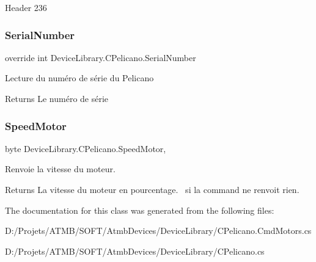 Header 236\mbox{\label{class_device_library_1_1_c_pelicano_a74a1a52309b0331bb2f6510c698a7183}} 
\subsubsection{\texorpdfstring{Serial\+Number}{SerialNumber}}
{\footnotesize\ttfamily override int Device\+Library.\+C\+Pelicano.\+Serial\+Number\hspace{0.3cm}{\ttfamily [get]}}



Lecture du numéro de série du Pelicano 

\begin{DoxyReturn}{Returns}
Le numéro de série
\end{DoxyReturn}
\mbox{\label{class_device_library_1_1_c_pelicano_a7f5c785d7c8107df1bc22912700438bc}} 
\subsubsection{\texorpdfstring{Speed\+Motor}{SpeedMotor}}
{\footnotesize\ttfamily byte Device\+Library.\+C\+Pelicano.\+Speed\+Motor\hspace{0.3cm}{\ttfamily [get]}, {\ttfamily [set]}}



Renvoie la vitesse du moteur. 

\begin{DoxyReturn}{Returns}
La vitesse du moteur en pourcentage.~ si la command ne renvoit rien. 
\end{DoxyReturn}


The documentation for this class was generated from the following files\+:\begin{DoxyCompactItemize}
\item 
D\+:/\+Projets/\+A\+T\+M\+B/\+S\+O\+F\+T/\+Atmb\+Devices/\+Device\+Library/C\+Pelicano.\+Cmd\+Motors.\+cs\item 
D\+:/\+Projets/\+A\+T\+M\+B/\+S\+O\+F\+T/\+Atmb\+Devices/\+Device\+Library/C\+Pelicano.\+cs\end{DoxyCompactItemize}
